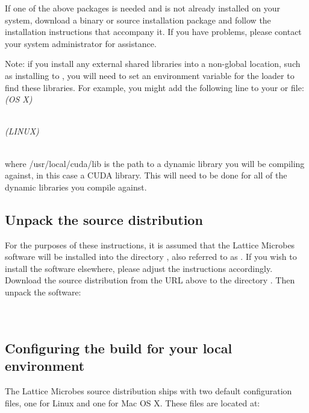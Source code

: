 If one of the above packages is needed and is not already installed on your system, download a binary or source installation package and follow the installation instructions that accompany it. If you have problems, please contact your system administrator for assistance.

Note: if you install any external shared libraries into a non-global location, such as installing to , you will need to set an environment variable for the loader to find these libraries.
For example, you might add the following line to your  or  file:\\

{\it (OS X)}

\\

{\it (LINUX)}

\\

where /usr/local/cuda/lib is the path to a dynamic library you will be compiling against, in this case a CUDA library.  This will need to be done for all of the dynamic libraries you compile against.

\subsection{Unpack the source distribution}

For the purposes of these instructions, it is assumed that the Lattice Microbes software will be installed into the directory , also referred to as . If you wish to install the software elsewhere, please adjust the instructions accordingly.\\

Download the source distribution from the URL above to the directory .  Then unpack the software:\\

\\
\\

\subsection{Configuring the build for your local environment}
\label{staticDynamic}
The Lattice Microbes source distribution ships with two default configuration files, one for Linux and one for Mac OS X. These files are located at:\\

